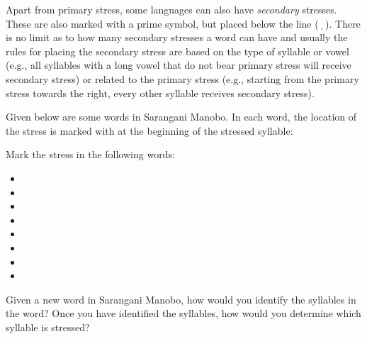\begin{refsection}
Apart from primary stress, some languages can also have \textit{secondary} stresses. These are also marked with a prime symbol, but placed below the line (\,ˌ\,). There is no limit as to how many secondary stresses a word can have and usually the rules for placing the secondary stress are based on the type of syllable or vowel (e.g., all syllables with a long vowel that do not bear primary stress will receive secondary stress) or related to the primary stress (e.g., starting from the primary stress towards the right, every other syllable receives secondary stress).

\begin{problem}{\langnameManobo}{\nameSVaduguru}{}
Given below are some words in Sarangani Manobo. In each word, the location of the stress is marked with  at the beginning of the stressed syllable:

\begin{exe}\sloppy
\end{exe}

\begin{assgts}
\item Mark the stress in the following words:
\begin{multicols}{2}
\noindent 
    \begin{itemize}
    \item[] 
    \item[] 
    \item[] 
    \item[] 
    \item[] 
    \item[] 
    \item[] 
    \item[] 
    \end{itemize}
\end{multicols}

\item Given a new word in Sarangani Manobo, how would you identify the syllables in the word? Once you have identified the syllables, how would you determine which syllable is stressed?
\end{assgts}
\end{problem}


\end{refsection}
